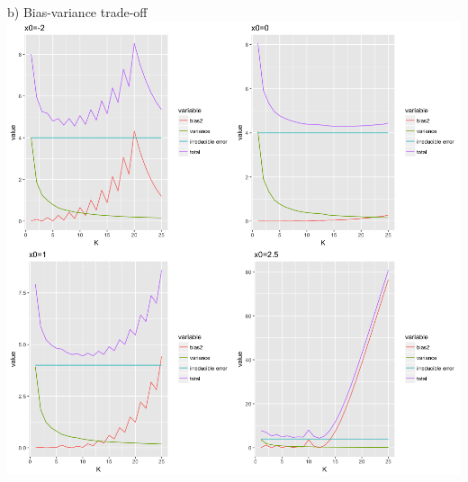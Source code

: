 \documentclass[ignorenonframetext,]{beamer}
\begin{document}
\begin{frame}
\begin{block}{b) Bias-variance trade-off}
\includegraphics{Prob1f5.png}

\end{block}

\end{frame}
\end{document}
